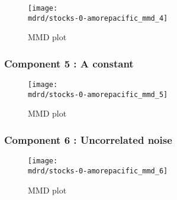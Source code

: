 \documentclass{article} %
\begin{document}
\begin{figure}[H]
\newcommand{\wmgd}{0.5\columnwidth}
\newcommand{\hmgd}{3.0cm}
\newcommand{\mdrd}{stocks-0-amorepacific}
\newcommand{\mbm}{\hspace{-0.3cm}}
\texttt{[image: \\mdrd/stocks-0-amorepacific\_mmd\_4]}
\caption{
MMD plot}
\label{fig:mmd4}
\end{figure}

\subsubsection{Component 5 : A constant}

\begin{figure}[H]
\newcommand{\wmgd}{0.5\columnwidth}
\newcommand{\hmgd}{3.0cm}
\newcommand{\mdrd}{stocks-0-amorepacific}
\newcommand{\mbm}{\hspace{-0.3cm}}
\texttt{[image: \\mdrd/stocks-0-amorepacific\_mmd\_5]}
\caption{
MMD plot}
\label{fig:mmd5}
\end{figure}

\subsubsection{Component 6 : Uncorrelated noise}

\begin{figure}[H]
\newcommand{\wmgd}{0.5\columnwidth}
\newcommand{\hmgd}{3.0cm}
\newcommand{\mdrd}{stocks-0-amorepacific}
\newcommand{\mbm}{\hspace{-0.3cm}}
\texttt{[image: \\mdrd/stocks-0-amorepacific\_mmd\_6]}
\caption{
MMD plot}
\label{fig:mmd6}
\end{figure}
\end{document}

